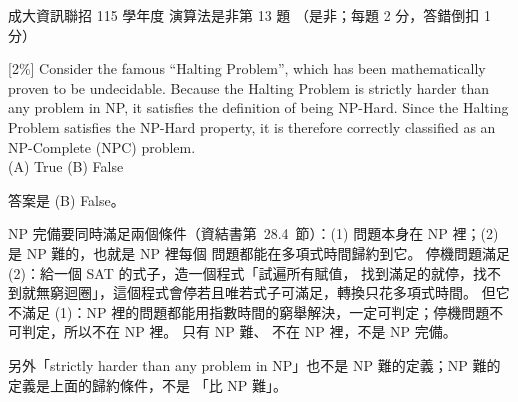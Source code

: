 \begin{pastexam}[label={px:ncku-115-prog-10}]{成大資訊聯招 115 學年度 演算法是非第 13 題}
（是非；每題 2 分，答錯倒扣 1 分）

[2\%] Consider the famous ``Halting Problem'', which has been mathematically proven to be undecidable.
Because the Halting Problem is strictly harder than any problem in NP, it satisfies the definition of
being NP-Hard. Since the Halting Problem satisfies the NP-Hard property, it is therefore correctly
classified as an NP-Complete (NPC) problem.\\
(A) True \qquad (B) False
\end{pastexam}

\begin{pastsoln}
答案是 (B) False。

NP 完備要同時滿足兩個條件（資結書第~28.4~節）：(1) 問題本身在 NP 裡；(2) 是 NP 難的，也就是 NP 裡每個
問題都能在多項式時間歸約到它。 停機問題滿足 (2)：給一個 \textsc{SAT} 的式子，造一個程式「試遍所有賦值，
找到滿足的就停，找不到就無窮迴圈」，這個程式會停若且唯若式子可滿足，轉換只花多項式時間。 但它不滿足
(1)：NP 裡的問題都能用指數時間的窮舉解決，一定可判定；停機問題不可判定，所以不在 NP 裡。 只有 NP 難、
不在 NP 裡，不是 NP 完備。

另外「strictly harder than any problem in NP」也不是 NP 難的定義；NP 難的定義是上面的歸約條件，不是
「比 NP 難」。
\end{pastsoln}
